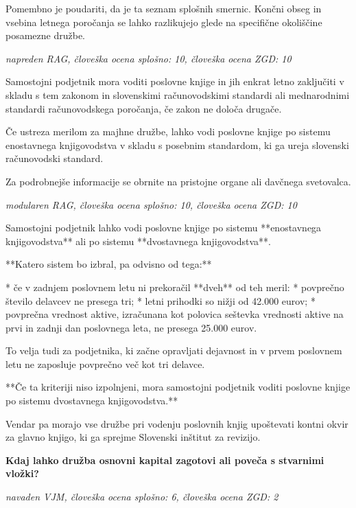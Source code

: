 \documentclass[a4paper,12pt,openright]{book}
\begin{document}
Pomembno je poudariti, da je ta seznam splošnih smernic. Končni obseg in vsebina letnega poročanja se lahko razlikujejo glede na specifične okoliščine posamezne družbe.

\vspace{0.5cm}
\textit{napreden RAG, človeška ocena splošno: 10, človeška ocena ZGD: 10}

Samostojni podjetnik mora voditi poslovne knjige in jih enkrat letno zaključiti v skladu s tem zakonom in slovenskimi računovodskimi standardi ali mednarodnimi standardi računovodskega poročanja, če zakon ne določa drugače.

Če ustreza merilom za majhne družbe, lahko vodi poslovne knjige po sistemu enostavnega knjigovodstva v skladu s posebnim standardom, ki ga ureja slovenski računovodski standard.


Za podrobnejše informacije se obrnite na pristojne organe ali davčnega svetovalca.

\vspace{0.5cm}
\textit{modularen RAG, človeška ocena splošno: 10, človeška ocena ZGD: 10}

Samostojni podjetnik lahko vodi poslovne knjige po sistemu **enostavnega knjigovodstva** ali po sistemu **dvostavnega knjigovodstva**.

**Katero sistem bo izbral, pa odvisno od tega:**

*  če v zadnjem poslovnem letu ni prekoračil **dveh** od teh meril:
* povprečno število delavcev ne presega tri;
* letni prihodki so nižji od 42.000 eurov;
* povprečna vrednost aktive, izračunana kot polovica seštevka vrednosti aktive na prvi in zadnji dan poslovnega leta, ne presega 25.000 eurov.

To velja tudi za podjetnika, ki začne opravljati dejavnost in v prvem poslovnem letu ne zaposluje povprečno več kot tri delavce.

**Če ta kriteriji niso izpolnjeni, mora samostojni podjetnik voditi poslovne knjige po sistemu dvostavnega knjigovodstva.**



Vendar pa morajo vse družbe pri vodenju poslovnih knjig upoštevati kontni okvir za glavno knjigo, ki ga sprejme Slovenski inštitut za revizijo.

\vspace{0.5cm}
\textbf{Kdaj lahko družba osnovni kapital zagotovi ali poveča s stvarnimi vložki?}

\textit{navaden VJM, človeška ocena splošno: 6, človeška ocena ZGD: 2}
\end{document}
